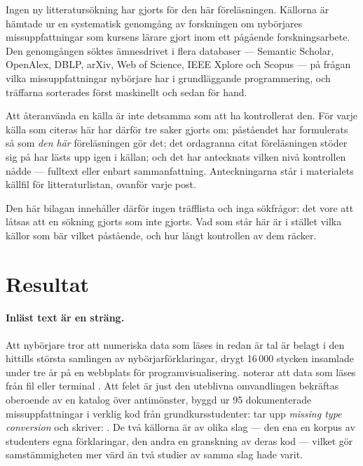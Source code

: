 Ingen ny litteratursökning har gjorts för den här föreläsningen.
Källorna är hämtade ur en systematisk genomgång av forskningen om
nybörjares missuppfattningar som kursens lärare gjort inom ett
pågående forskningsarbete.  Den genomgången söktes ämnesdrivet i flera
databaser --- Semantic Scholar, OpenAlex, DBLP, arXiv, Web of Science,
IEEE Xplore och Scopus --- på frågan vilka missuppfattningar nybörjare
har i grundläggande programmering, och träffarna sorterades först
maskinellt och sedan för hand.

Att återanvända en källa är inte detsamma som att ha kontrollerat den.
För varje källa som citeras här har därför tre saker gjorts om:
påståendet har formulerats så som \emph{den här} föreläsningen gör det;
det ordagranna citat föreläsningen stöder sig på har lästs upp igen i
källan; och det har antecknats vilken nivå kontrollen nådde --- fulltext
eller enbart sammanfattning.  Anteckningarna står i materialets källfil
för litteraturlistan, ovanför varje post.

Den här bilagan innehåller därför ingen träfflista och inga sökfrågor:
det vore att låtsas att en sökning gjorts som inte gjorts.  Vad som står
här är i stället vilka källor som bär vilket påstående, och hur långt
kontrollen av dem räcker.

\section{Resultat}
\label{sec:input-resultat}

\paragraph{Inläst text är en sträng.}  Att nybörjare tror att numeriska
data som läses in redan är tal är belagt i den hittills största samlingen
av nybörjarförklaringar, drygt 16\,000 stycken insamlade under tre år på
en webbplats för programvisualisering.  \Textcite{GuoMarkelZhang2020}
noterar att data som läses från fil eller terminal
.  Att felet är just den uteblivna omvandlingen bekräftas
oberoende av en katalog över antimönster, byggd ur 95 dokumenterade
missuppfattningar i verklig kod från grundkursstudenter:
\textcite{Bosse2021Antipatterns} tar upp \emph{missing type conversion}
och skriver: .  De två källorna är av olika slag --- den ena en
korpus av studenters egna förklaringar, den andra en granskning av deras
kod --- vilket gör samstämmigheten mer värd än två studier av samma slag
hade varit.

